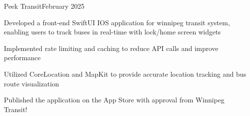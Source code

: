\begin{resume_subsection}{Peek Transit}{February 2025}
    \begin{subitems}
        \item Developed a front-end SwiftUI IOS application for winnipeg transit system, enabling users to track buses in real-time with lock/home screen widgets
        \item Implemented rate limiting and caching to reduce API calls and improve performance
        \item Utilized CoreLocation and MapKit to provide accurate location tracking and bus route visualization
        \item Published the application on the App Store with approval from Winnipeg Transit!
    \end{subitems}
\end{resume_subsection}

